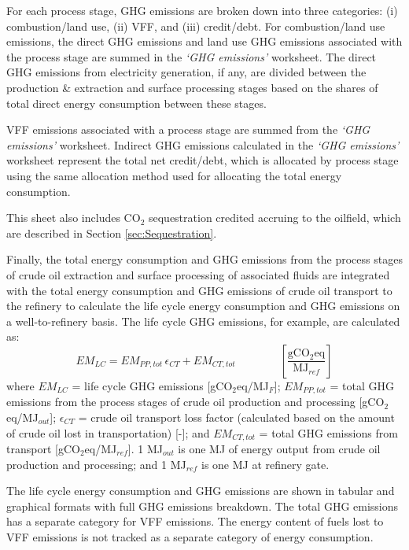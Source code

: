 \documentclass[11pt]{report}
\newcommand{\sheet}[1]{\textit{`{#1}'}}
\newcommand{\eqnunitfrac}[2]{\quad\quad \scriptstyle{\left[\frac{\text{#1}}{\text{#2}}\right]}}
\begin{document}
For each process stage, GHG emissions are broken down into three categories: (i) combustion/land use, (ii) VFF, and (iii) credit/debt. For combustion/land use emissions, the direct GHG emissions and land use GHG emissions associated with the process stage are summed in the \sheet{GHG emissions} worksheet. The direct GHG emissions from electricity generation, if any, are divided between the production \& extraction and surface processing stages based on the shares of total direct energy consumption between these stages. 

VFF emissions associated with a process stage are summed from the \sheet{GHG emissions} worksheet. Indirect GHG emissions calculated in the \sheet{GHG emissions} worksheet represent the total net credit/debt, which is allocated by process stage using the same allocation method used for allocating the total energy consumption.

This sheet also includes CO$_2$ sequestration credited accruing to the oilfield, which are described in Section \ref{sec:Sequestration}.

Finally, the total energy consumption and GHG emissions from the process stages of crude oil extraction and surface processing of associated fluids are integrated with the total energy consumption and GHG emissions of crude oil transport to the refinery to calculate the life cycle energy consumption and GHG emissions on a well-to-refinery basis. The life cycle GHG emissions, for example, are calculated as:
\begin{equation}
EM_{LC} = EM_{PP,tot}\,\epsilon_{CT}+EM_{CT,tot} \quad\quad\eqnunitfrac{gCO$_{2}$eq}{MJ$_{ref}$}
\end{equation}
where $EM_{LC}$ = life cycle GHG emissions [gCO$_{2}$eq/MJ$_{F}$]; $EM_{PP,tot}$ = total GHG emissions from the process stages of crude oil production and processing [gCO$_{2}$eq/MJ$_{out}$]; $\epsilon_{CT}$ = crude oil transport loss factor (calculated based on the amount of crude oil lost in transportation) [-]; and $EM_{CT,tot}$ = total GHG emissions from transport [gCO$_{2}$eq/MJ$_{ref}$]. 1 MJ$_{out}$ is one MJ of energy output from crude oil production and processing; and 1 MJ$_{ref}$ is one MJ at refinery gate. 

The life cycle energy consumption and GHG emissions are shown in tabular and graphical formats with full GHG emissions breakdown. The total GHG emissions has a separate category for VFF emissions. The energy content of fuels lost to VFF emissions is not tracked as a separate category of energy consumption. 
\end{document}
